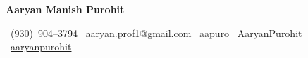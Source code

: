 \documentclass[letterpaper,11pt]{article}
\begin{document}
\justifying


\begin{center}
  {\LARGE \textbf{Aaryan Manish Purohit}}
\end{center}

\vspace{-12pt}

\begin{center}
\faPhone*[regular]\ (930)~904--3794 \enspace \textbar \enspace
\faEnvelope\ \href{mailto:aaryan.prof1@gmail.com}{aaryan.prof1@gmail.com} \enspace \textbar \enspace
\faLinkedin\ \href{https://www.linkedin.com/in/aapuro/}{aapuro} \enspace \textbar \enspace
\faGithub\ \href{https://github.com/AaryanPurohit}{AaryanPurohit} \enspace \textbar \enspace
\faGlobe\ \href{https://aaryan-purohit-portfolio.vercel.app/}{aaryanpurohit}
\end{center}
\vspace{-6pt}




\end{document}
